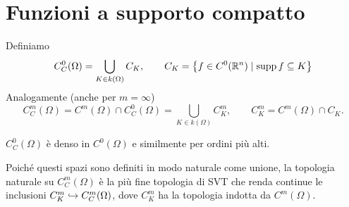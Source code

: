 \section{Funzioni a supporto compatto}

\begin{definition}
Definiamo
\[C^0_C(\Omega)=\bigcup_{K\in k(\Omega)}C_K,\qquad C_K=\left\{{f\in C^0(\mathbb{R}^n)\mid \operatorname{supp} f\subseteq K}\right\}\]
Analogamente (anche per $m=\infty$)
\[C_C^m(\Omega)=C^m(\Omega)\cap C^0_C(\Omega)=\bigcup_{K\in k(\Omega)}C^m_K,\qquad C_K^m=C^m(\Omega)\cap C_K.\]
\end{definition}

\begin{remark}
$C^0_C(\Omega)$ \`e denso in $C^0(\Omega)$ e similmente per ordini pi\`u alti.
\end{remark}

Poich\'e questi spazi sono definiti in modo naturale come unione, la topologia naturale su $C_C^m(\Omega)$ \`e la pi\`u fine topologia di SVT che renda continue le inclusioni $C_K^m\hookrightarrow C^m_C(\Omega)$, dove $C^m_K$ ha la topologia indotta da $C^m(\Omega)$.